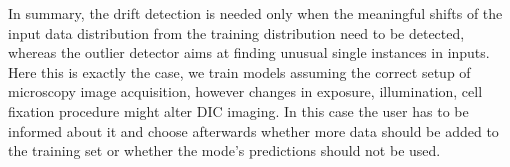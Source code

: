 In summary, the drift detection is needed only when the meaningful shifts of the input data distribution from the training distribution need to be detected, whereas the outlier detector aims at finding unusual single instances in inputs. Here this is exactly the case, we train models assuming the correct setup of microscopy image acquisition, however changes in exposure, illumination, cell fixation procedure might alter DIC imaging. In this case the user has to be informed about it and choose afterwards whether more data should be added to the training set or whether the mode's predictions should not be used.
